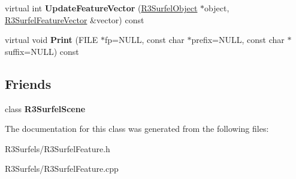 \begin{DoxyCompactItemize}
\item 
virtual int {\bfseries Update\+Feature\+Vector} (\hyperlink{class_r3_surfel_object}{R3\+Surfel\+Object} $\ast$object, \hyperlink{class_r3_surfel_feature_vector}{R3\+Surfel\+Feature\+Vector} \&vector) const \hypertarget{class_r3_surfel_feature_af2ebf6ba16bbccab4d0fcc68a5a4fb10}{}\label{class_r3_surfel_feature_af2ebf6ba16bbccab4d0fcc68a5a4fb10}

\item 
virtual void {\bfseries Print} (F\+I\+LE $\ast$fp=N\+U\+LL, const char $\ast$prefix=N\+U\+LL, const char $\ast$suffix=N\+U\+LL) const \hypertarget{class_r3_surfel_feature_acfe64c92a31afe0033fd1f0cede7d91e}{}\label{class_r3_surfel_feature_acfe64c92a31afe0033fd1f0cede7d91e}

\end{DoxyCompactItemize}
\subsection*{Friends}
\begin{DoxyCompactItemize}
\item 
class {\bfseries R3\+Surfel\+Scene}\hypertarget{class_r3_surfel_feature_af9bb32c0eac7d1d54787bbc6b44586b6}{}\label{class_r3_surfel_feature_af9bb32c0eac7d1d54787bbc6b44586b6}

\end{DoxyCompactItemize}


The documentation for this class was generated from the following files\+:\begin{DoxyCompactItemize}
\item 
R3\+Surfels/R3\+Surfel\+Feature.\+h\item 
R3\+Surfels/R3\+Surfel\+Feature.\+cpp\end{DoxyCompactItemize}

